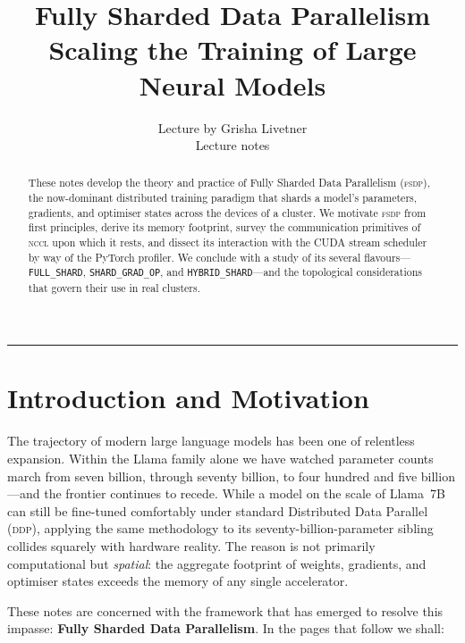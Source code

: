 \documentclass[11pt,a4paper]{article}
\title{\textbf{Fully Sharded Data Parallelism} \\[0.3em]
\large Scaling the Training of Large Neural Models}
\author{Lecture by Grisha Livetner \\ \small Lecture notes}
\date{}
\theoremstyle{definition}
\theoremstyle{remark}
\newcommand{\FSDP}{\textsc{fsdp}}
\newcommand{\DDP}{\textsc{ddp}}
\newcommand{\NCCL}{\textsc{nccl}}
\begin{document}
\sloppy
\maketitle

\begin{abstract}
\noindent
These notes develop the theory and practice of Fully Sharded Data
Parallelism (\FSDP{}), the now-dominant distributed training paradigm that
shards a model's parameters, gradients, and optimiser states across the
devices of a cluster. We motivate \FSDP{} from first principles, derive its
memory footprint, survey the communication primitives of \NCCL{} upon which
it rests, and dissect its interaction with the CUDA stream scheduler by way
of the PyTorch profiler. We conclude with a study of its several
flavours---\texttt{FULL\_SHARD}, \texttt{SHARD\_GRAD\_OP}, and
\texttt{HYBRID\_SHARD}---and the topological considerations that govern
their use in real clusters.
\end{abstract}

\tableofcontents
\bigskip
\hrule
\bigskip

\section{Introduction and Motivation}


The trajectory of modern large language models has been one of relentless expansion. Within the Llama family alone we have watched parameter counts march from seven billion, through seventy billion, to four hundred and five billion---and the frontier continues to recede. While a model on the scale of Llama~7B can still be fine-tuned comfortably under standard Distributed Data Parallel (\DDP{}), applying the same methodology to its seventy-billion-parameter sibling collides squarely with hardware reality. The reason is not primarily computational but \emph{spatial}: the aggregate footprint of weights, gradients, and optimiser states exceeds the memory of any single accelerator.

These notes are concerned with the framework that has emerged to resolve this impasse: \textbf{Fully Sharded Data Parallelism}. In the pages that follow we shall:
\end{document}
